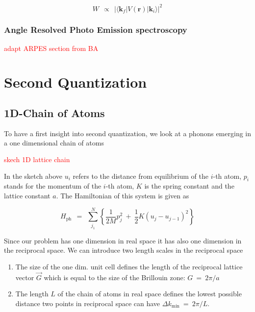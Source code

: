 \documentclass[10pt]{report}
\numberwithin{equation}{chapter}
\newcommand{\vc}[1]{ %
  \mathbf{#1}
}
\begin{document}
\begin{equation}
  W ~~\propto~~ | \langle \vc{k}_f | V(\vc{r}) | \vc{k}_i \rangle |^2
\end{equation}


\subsection{Angle Resolved Photo Emission spectroscopy}


\textcolor{red}{adapt ARPES section from BA}









%

\chapter{Second Quantization}

\section{1D-Chain of Atoms}

To have a first insight into second quantization, we look at a phonons emerging in a one dimensional chain of atoms

\textcolor{red}{skech 1D lattice chain}


In the sketch above $u_i$ refers to the distance from equilibrium of the $i$-th atom, $p_i$ stands for the momentum of the $i$-th atom, $K$ is the spring constant and the lattice constant $a$.
The Hamiltonian of this system is given as

\begin{equation} \label{eq:ham_phonon_chain}
  H_\text{ph} ~~=~~ \sum_{j_1}^N \left\{ \frac{1}{2M} p_j^2 ~+~ \frac{1}{2} K (u_j - u_{j-1})^2 \right\}
\end{equation}

Since our problem has one dimension in real space it has also one dimension in the reciprocal space. We can introduce two length scales in the reciprocal space

\begin{enumerate}
  \item{The size of the one dim. unit cell defines the length of the reciprocal lattice vector $\vec{G}$ which is equal to the size of the Brillouin zone: $ G ~=~ 2\pi/a$}
  \item{The length $L$ of the chain of atoms in real space defines the lowest possible distance two points in reciprocal space can have $\Delta k_\text{min} ~=~ 2\pi/L$.}
\end{enumerate}
\end{document}
